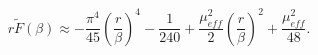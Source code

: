 \begin{equation}
r\widetilde{F}\left(\beta \right)\approx -\frac{\pi ^{4}}{45}\left(\frac{r}{\beta }\right)^{4}-\frac{1}{240}+\frac{\mu _{eff}^{2}}{2}\left(\frac{r}{\beta }\right)^{2}+\frac{\mu _{eff}^{2}}{48}.\end{equation}

